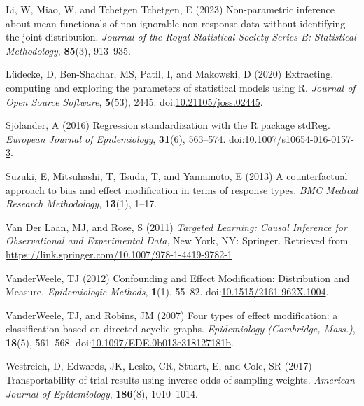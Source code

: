 \documentclass[
  single column]{article}
\newlength{\cslhangindent}
\newenvironment{CSLReferences}[2] %
 {\begin{list}{}{%
  \setlength{\itemindent}{0pt}
  \setlength{\leftmargin}{0pt}
  \setlength{\parsep}{0pt}
  \ifodd #1
   \setlength{\leftmargin}{\cslhangindent}
   \setlength{\itemindent}{-1\cslhangindent}
  \fi
  \setlength{\itemsep}{#2\baselineskip}}}
 {\end{list}}
\begin{document}
\begin{CSLReferences}{1}{0}
Li, W, Miao, W, and Tchetgen Tchetgen, E (2023) Non-parametric inference
about mean functionals of non-ignorable non-response data without
identifying the joint distribution. \emph{Journal of the Royal
Statistical Society Series B: Statistical Methodology}, \textbf{85}(3),
913--935.

Lüdecke, D, Ben-Shachar, MS, Patil, I, and Makowski, D (2020)
Extracting, computing and exploring the parameters of statistical models
using {R}. \emph{Journal of Open Source Software}, \textbf{5}(53), 2445.
doi:\href{https://doi.org/10.21105/joss.02445}{10.21105/joss.02445}.

Sjölander, A (2016) Regression standardization with the R package
stdReg. \emph{European Journal of Epidemiology}, \textbf{31}(6),
563--574.
doi:\href{https://doi.org/10.1007/s10654-016-0157-3}{10.1007/s10654-016-0157-3}.

Suzuki, E, Mitsuhashi, T, Tsuda, T, and Yamamoto, E (2013) A
counterfactual approach to bias and effect modification in terms of
response types. \emph{BMC Medical Research Methodology}, \textbf{13}(1),
1--17.

Van Der Laan, MJ, and Rose, S (2011) \emph{Targeted Learning: Causal
Inference for Observational and Experimental Data}, New York, NY:
Springer. Retrieved from
\url{https://link.springer.com/10.1007/978-1-4419-9782-1}

VanderWeele, TJ (2012) Confounding and Effect Modification: Distribution
and Measure. \emph{Epidemiologic Methods}, \textbf{1}(1), 55--82.
doi:\href{https://doi.org/10.1515/2161-962X.1004}{10.1515/2161-962X.1004}.

VanderWeele, TJ, and Robins, JM (2007) Four types of effect
modification: a classification based on directed acyclic graphs.
\emph{Epidemiology (Cambridge, Mass.)}, \textbf{18}(5), 561--568.
doi:\href{https://doi.org/10.1097/EDE.0b013e318127181b}{10.1097/EDE.0b013e318127181b}.

Westreich, D, Edwards, JK, Lesko, CR, Stuart, E, and Cole, SR (2017)
Transportability of trial results using inverse odds of sampling
weights. \emph{American Journal of Epidemiology}, \textbf{186}(8),
1010--1014.

\end{CSLReferences}
\end{document}
